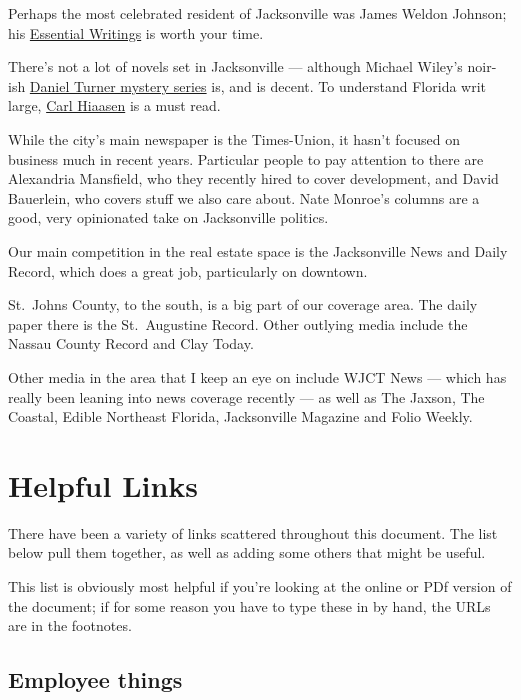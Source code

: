 \documentclass[
  11pt,
  american,
  letterpaperpaper,
  extrafontsizes,onecolumn,openright
  ]{memoir}
\begin{document}
Perhaps the most celebrated resident of Jacksonville was James Weldon Johnson; his \href{https://www.amazon.com/Essential-Writings-Johnson-Library-Classics/dp/0812975324/ref=sr_1_1}{Essential Writings} is worth your time.

There's not a lot of novels set in Jacksonville --- although Michael Wiley's noir-ish \href{https://www.amazon.com/dp/B07PLPNSCH}{Daniel Turner mystery series} is, and is decent. To understand Florida writ large, \href{https://www.amazon.com/stores/Carl-Hiaasen/author/B00KWZGGAG}{Carl Hiaasen} is a must read.

While the city's main newspaper is the Times-Union, it hasn't focused on business much in recent years. Particular people to pay attention to there are Alexandria Mansfield, who they recently hired to cover development, and David Bauerlein, who covers stuff we also care about. Nate Monroe's columns are a good, very opinionated take on Jacksonville politics.

Our main competition in the real estate space is the Jacksonville News and Daily Record, which does a great job, particularly on downtown.

St.~Johns County, to the south, is a big part of our coverage area. The daily paper there is the St.~Augustine Record. Other outlying media include the Nassau County Record and Clay Today.

Other media in the area that I keep an eye on include WJCT News --- which has really been leaning into news coverage recently --- as well as The Jaxson, The Coastal, Edible Northeast Florida, Jacksonville Magazine and Folio Weekly.

\hypertarget{helpful-links}{%
\chapter{Helpful Links}\label{helpful-links}}

There have been a variety of links scattered throughout this document. The list below pull them together, as well as adding some others that might be useful.

This list is obviously most helpful if you're looking at the online or PDf version of the document; if for some reason you have to type these in by hand, the URLs are in the footnotes.

\hypertarget{employee-things}{%
\section*{Employee things}\label{employee-things}}
\end{document}
